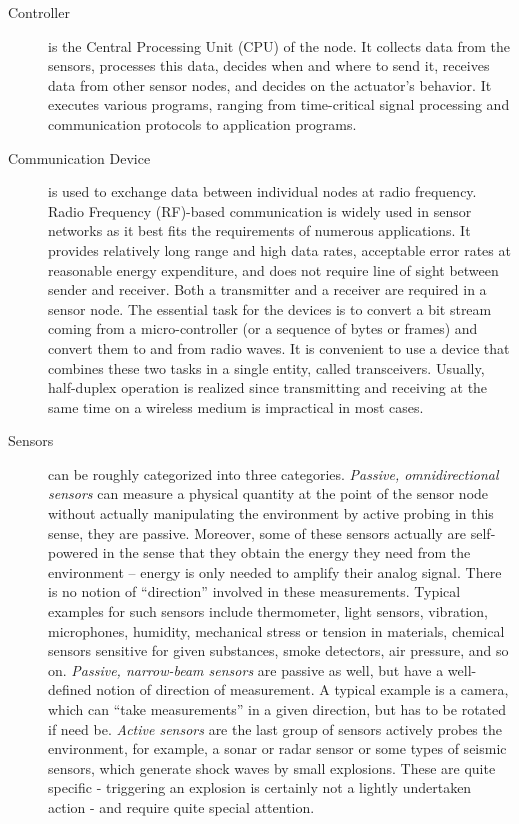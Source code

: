 	\begin{description}
	\item[Controller] is the Central Processing Unit (CPU) of the node.
		It collects data from the sensors, processes this data, decides when and where to send it, receives data from other sensor nodes, and decides on the actuator's behavior.
		It executes various programs, ranging from time-critical signal processing and communication protocols to application programs.
	
	\item[Communication Device] is used to exchange data between individual nodes at radio frequency.
		Radio Frequency (RF)-based communication is widely used in sensor networks as it best fits the requirements of numerous applications.
		It provides relatively long range and high data rates, acceptable error rates at reasonable energy expenditure, and does not require line of sight between sender and receiver.
		Both a transmitter and a receiver are required in a sensor node. 
		The essential task for the devices is to convert a bit stream coming from a micro-controller (or a sequence of bytes or frames) and convert them to and from radio waves. 
		It is convenient to use a device that combines these two tasks in a single entity, called transceivers. 
		Usually, half-duplex operation is realized since transmitting and receiving at the same time on a wireless medium is impractical in most cases.

	\item[Sensors] can be roughly categorized into three categories.
		\textit{Passive, omnidirectional sensors} can measure a physical quantity at the point of the sensor node without actually manipulating the environment by active probing in this sense, they are passive. 
		Moreover, some of these sensors actually are self-powered in the sense that they obtain the energy they need from the environment – energy is only needed to amplify their analog signal. 
		There is no notion of ``direction'' involved in these measurements.
		Typical examples for such sensors include thermometer, light sensors, vibration, microphones, humidity, mechanical stress or tension in materials, chemical sensors sensitive for given substances, smoke detectors, air pressure, and so on.
		\textit{Passive, narrow-beam sensors} are passive as well, but have a well-defined notion of direction of measurement. 
		A typical example is a camera, which can ``take measurements'' in a given direction, but has to be rotated if need be.
		\textit{Active sensors} are the last group of sensors actively probes the environment, for example, a sonar or radar sensor or some types of seismic sensors, which generate shock waves by small explosions.
		These are quite specific - triggering an explosion is certainly not a lightly undertaken action - and require quite special attention.


\end{description}
